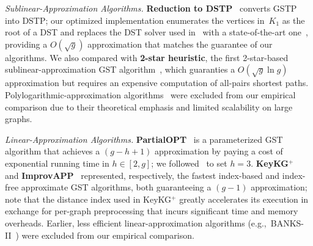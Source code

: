 \emph{Sublinear-Approximation Algorithms.} \textbf{Reduction to DSTP}~\cite{D_STP} converts GSTP into DSTP; our optimized implementation enumerates the vertices in~$K_1$ as the root of a DST and
replaces the DST solver used in~\cite{D_STP} with a state-of-the-art one~\cite{DiST}, providing a $O(\sqrt g)$ approximation that matches the guarantee of our algorithms.
We also compared with \textbf{2-star heuristic}, the first 2-star-based sublinear-approximation GST algorithm~\cite{dstar1}, which guaranties a $O(\sqrt g\ln g)$ approximation but requires an expensive computation of all-pairs shortest paths.
Polylogarithmic-approximation algorithms~\cite{PolyAppr_1, PolyAppr_2} were excluded from our empirical comparison due to their theoretical emphasis and limited scalability on large graphs.

\emph{Linear-Approximation Algorithms.} \textbf{PartialOPT}~\cite{ImprovAPP} is a parameterized GST algorithm that achieves a $(g-h+1)$ approximation by paying a cost of exponential running time in $h \in [2,g]$; we followed~\cite{ImprovAPP} to set $h=3$.
\textbf{KeyKG$^+$}~\cite{KeyKG} and \textbf{ImprovAPP}~\cite{ImprovAPP} represented, respectively, the fastest index-based and index-free approximate GST algorithms, both guaranteeing a $(g-1)$ approximation; note that the distance index used in KeyKG$^+$ greatly accelerates its execution
in exchange for per-graph preprocessing that incurs significant time and memory overheads.
Earlier, less efficient linear-approximation algorithms (e.g.,~BANKS-II~\cite{BANKS2}) were excluded from our empirical comparison.


